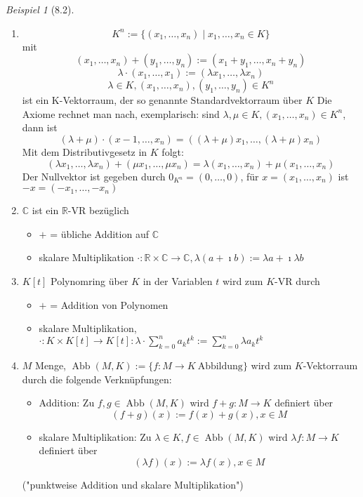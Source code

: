 \documentclass[a4paper]{scrartcl}
\DeclareMathOperator{\Abb}{Abb}
\theoremstyle{definition}
\theoremstyle{plain}
\theoremstyle{plain}
\theoremstyle{remark}
\theoremstyle{remark}
\theoremstyle{remark}
\theoremstyle{remark}
\theoremstyle{remark}
\newtheorem{ex}{Beispiel}
\newcommand{\I}{\ensuremath{\imath}}%
\begin{document}
\begin{ex}[8.2]
\mbox{}
\begin{enumerate}
\item \[K^n := \{(x_1,\ldots,x_n) \mid x_1,\ldots,x_n \in K\}\]
mit
\[(x_1,\ldots,x_n) + (y_1,\ldots,y_n) := (x_1 + y_1,\ldots,x_n + y_n)\]
\[\lambda\cdot(x_1,\ldots,x_1) := (\lambda x_1,\ldots,\lambda x_n)\]
\[\lambda \in K, (x_1,\ldots,x_n),(y_1,\ldots,y_n)\in K^n\]
ist ein K-Vektorraum, der so genannte Standardvektorraum über $K$
Die Axiome rechnet man nach, exemplarisch: sind $\lambda,\mu\in K, (x_1,\ldots,x_n)\in K^n$, dann ist
\[(\lambda + \mu) \cdot (x-1,\ldots,x_n) = ((\lambda + \mu)x_1,\ldots,(\lambda + \mu)x_n)\]
Mit dem Distributivgesetz in $K$ folgt:
\[(\lambda x_1,\ldots,\lambda x_n) + (\mu x_1,\ldots,\mu x_n) = \lambda(x_1,\ldots,x_n) + \mu(x_1,\ldots,x_n)\]
Der Nullvektor ist gegeben durch $0_{K^n} = (0,\ldots,0)$, für $x =(x_1,\ldots,x_n)$ ist $-x = (-x_1,\ldots,-x_n)$
\item $\mathbb{C}$ ist ein $\mathbb{R}$-VR bezüglich
\begin{itemize}
\item $+$ = übliche Addition auf $\mathbb{C}$
\item skalare Multiplikation $\cdot:\mathbb{R}\times\mathbb{C} \to \mathbb{C}, \lambda (a + \I b) := \lambda a + \I \lambda b$
\end{itemize}
\item $K[t]$ Polynomring über $K$ in der Variablen $t$ wird zum $K$-VR durch
\begin{itemize}
\item $+$ = Addition von Polynomen
\item skalare Multiplikation, $\cdot: K\times K[t] \to K[t]: \lambda \cdot \sum_{k = 0}^n a_k t^k := \sum_{k = 0}^n \lambda a_k t^k$
\end{itemize}
\item $M$ Menge, $\Abb(M,K):= \{f: M \to K~\text{Abbildung}\}$ wird zum $K$-Vektorraum durch die folgende Verknüpfungen:
\begin{itemize}
\item Addition: Zu $f,g\in \Abb(M,K)$ wird $f + g: M \to K$ definiert über
\[(f + g)(x) := f(x) + g(x), x\in M\]
\item skalare Multiplikation: Zu $\lambda \in K, f\in \Abb(M,K)$ wird $\lambda f: M \to K$ definiert über
\[(\lambda f)(x) := \lambda f(x), x\in M\]
\end{itemize}
("punktweise Addition und skalare Multiplikation")
\end{enumerate}
\end{ex}
\end{document}
